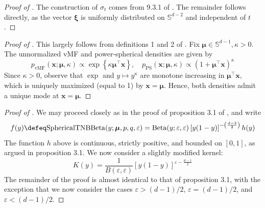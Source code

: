 \begin{proof}[Proof of ]
The construction of $\sigma_t$ comes from 9.3.1 of \cite{mardia2009directional}. The remainder follows directly, as
the vector $\boldsymbol{\xi}$ is uniformly distributed on $\mathbb{S}^{d - 2}$ and independent of $t$.
\end{proof}

\begin{proof}[Proof of ]
This largely follows from definitions 1 and 2 of \cite{decao2020powersphericaldistribution}.
Fix $\boldsymbol{\mu} \in \mathbb{S}^{d - 1}, \kappa > 0$. The unnormalized vMF and power-spherical densities
are given by
\[
    p_{\text{vMF}}(\mathbf{x}; \boldsymbol{\mu}, \kappa) \propto \exp\left\{ \kappa\boldsymbol{\mu}^\top\mathbf{x} \right\}
    , \quad
    p_{\text{PS}}(\mathbf{x}; \boldsymbol{\mu}, \kappa) \propto \left(1 + \boldsymbol{\mu}^\top\mathbf{x}\right)^\kappa
\]
Since $\kappa > 0$, observe that $\exp$ and $y \mapsto y^\kappa$ are monotone increasing in $\boldsymbol{\mu}^\top\mathbf{x}$,
which is uniquely maximized (equal to 1) by $\mathbf{x} = \boldsymbol{\mu}$. Hence, both densities admit a unique mode at
$\mathbf{x} = \boldsymbol{\mu}$.
\end{proof}

\begin{proof}[Proof of ]
We may proceed closely as in the proof of proposition 3.1 of \cite{lederman2026triplyrandomizednegativebinomialbeta}, and write
\[
    f(y) \defeq \mathrm{SphericalTNBBeta}(y; \boldsymbol{\mu}, p, q, \varepsilon) = \text{Beta}(y; \varepsilon, \varepsilon)\left[y(1 - y)\right]^{-\left(\frac{d - 3}{2}\right)}h(y)
\]
The function $h$ above is continuous, strictly positive, and bounded on $[0, 1]$, as argued in proposition 3.1.
We now consider a slightly modified kernel:
\[
    K(y) = \frac{1}{B(\varepsilon, \varepsilon)}\left[y(1 - y)\right]^{\varepsilon - \frac{d - 1}{2}}
\]
The remainder of the proof is almost identical to that of proposition 3.1, with the exception that we now consider
the cases $\varepsilon > (d - 1)/2$, $\varepsilon = (d - 1)/2$, and $\varepsilon < (d - 1)/2$.
\end{proof}

